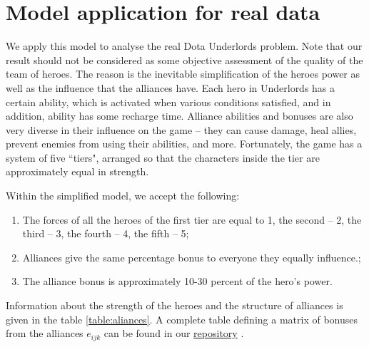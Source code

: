 \documentclass{article}
\begin{document}
\section{Model application for real data}
\label{SectionComputationalResults}
  
We apply this model to analyse the real Dota Underlords problem. Note that our result should not be considered as some objective assessment of the quality of the team of heroes. The reason is the inevitable simplification of the heroes power as well as the influence that the alliances have. Each hero in Underlords has a certain ability, which is activated when  various conditions satisfied, and in addition, ability has some recharge time. Alliance abilities and bonuses are also very diverse in their influence on the game -- they can cause damage, heal allies, prevent enemies from using their abilities, and more. Fortunately, the game has a system of five ``tiers", arranged so that the characters inside the tier are approximately equal in strength.

Within the simplified model, we accept the following:
\begin{enumerate}
\item The forces of all the heroes of the first tier are equal to 1,  the second -- 2, the third -- 3, the fourth -- 4, the fifth -- 5;
\item Alliances give the same percentage bonus to everyone they equally influence.;
\item The alliance bonus is approximately 10-30 percent of the hero’s power.
\end{enumerate}

Information about the strength of the heroes and the structure of alliances is given in the table \ref{table:aliances}. 
A complete table defining a matrix of bonuses from the alliances $e_{ijk} $ can be found in our \href{https://github.com/aponom84/UnderLords/blob/master/UnderLordsData.xlsx}{repository} \cite{UnderLordsInput}.
\end{document}
